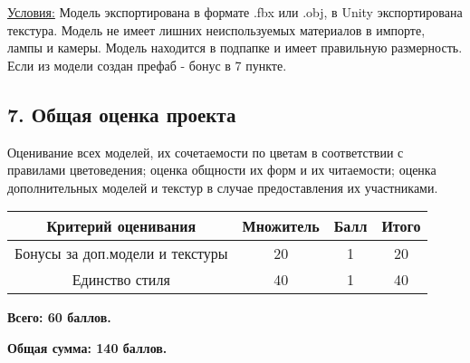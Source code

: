 \underline{Условия:} Модель экспортирована в формате .fbx или .obj, в Unity экспортирована текстура. Модель не имеет лишних неиспользуемых материалов в импорте, лампы и камеры. Модель находится в подпапке и имеет правильную размерность. Если из модели создан префаб - бонус в 7 пункте.

\subsection*{7. Общая оценка проекта}

Оценивание всех моделей, их сочетаемости по цветам в соответствии с правилами цветоведения; оценка общности их форм и их читаемости; оценка дополнительных моделей и текстур в случае предоставления их участниками. 

\begin{table}[H]
    \begin{center}
        \begin{tabular}{|c|c|c|c|}
            \hline
            Критерий оценивания &	Множитель &	Балл &	Итого \\
            \hline
            Бонусы за доп.модели и текстуры  & 20 & 1 & 20 \\
            \hline
            Единство стиля & 40	& 1 & 40 \\   
            \hline
        \end{tabular} 
    \end {center} 
\end{table}

\textbf{Всего: 60 баллов.}

\textbf{Общая сумма: 140 баллов.}

